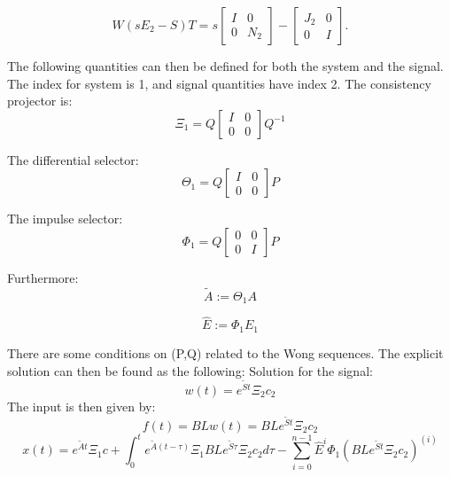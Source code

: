 \documentclass{article}
\begin{document}
\begin{equation}
    W(sE_2-S)T = s
    \begin{bmatrix}
        I & 0 \\
        0 & N_2
    \end{bmatrix}
    -
    \begin{bmatrix}
        J_2 & 0 \\ 
        0 & I
    \end{bmatrix}.
\end{equation}

The following quantities can then be defined for both the system and the signal.
\newline
The index for system is 1, and signal quantities have index 2. 
\newline
The consistency projector is: 
\begin{equation}
    \Xi_1 = Q
    \begin{bmatrix}
        I & 0 \\
        0 & 0
    \end{bmatrix}
    Q^{-1}
\end{equation}

The differential selector:
\begin{equation}
    \Theta_1 = Q
    \begin{bmatrix}
        I & 0 \\
        0 & 0
    \end{bmatrix}
    P
\end{equation}

The impulse selector:
\begin{equation}
    \Phi_1 = Q
    \begin{bmatrix}
        0 & 0 \\
        0 & I
    \end{bmatrix}
    P
\end{equation}

Furthermore: 
\begin{equation}
    \tilde{A} := \Theta_1 A
\end{equation}

\begin{equation}
    \hat{E} := \Phi_1 E_1
\end{equation}

There are some conditions on (P,Q) related to the Wong sequences. 
The explicit solution can then be found as the following: 
Solution for the signal: 
\begin{equation}
    w(t) = e^{\tilde{S} t} \Xi_2 c_2
\end{equation}
The input is then given by: 
\begin{equation}
    f(t) = BLw(t) = BL e^{\tilde{S} t} \Xi_2 c_2
\end{equation}
\begin{equation}
    x(t) = e^{\tilde{A} t} \Xi_1 c + \int_{0}^{t} e^{\tilde{A} (t-\tau)} \Xi_1 BL e^{\tilde{S} \tau} \Xi_2 c_2 d \tau - \sum_{i=0}^{n-1} \hat{E}^i \Phi_1 \left(BL e^{\tilde{S} t} \Xi_2 c_2 \right)^{(i)}
\end{equation}
\end{document}
